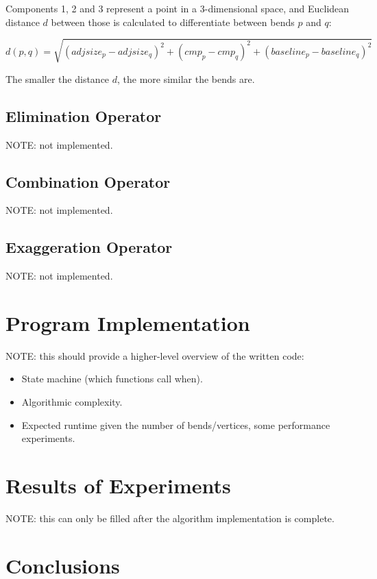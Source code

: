 \documentclass[a4paper]{article}
\begin{document}
Components 1, 2 and 3 represent a point in a 3-dimensional space, and Euclidean
distance $d$ between those is calculated to differentiate between bends $p$ and
$q$:

\[
    d(p,q) = \sqrt{(adjsize_p-adjsize_q)^2 +
                   (cmp_p-cmp_q)^2 +
                   (baseline_p-baseline_q)^2}
\]

The smaller the distance $d$, the more similar the bends are.

\subsection{Elimination Operator}

NOTE: not implemented.

\subsection{Combination Operator}

NOTE: not implemented.

\subsection{Exaggeration Operator}

NOTE: not implemented.

\section{Program Implementation}

NOTE: this should provide a higher-level overview of the written code:

\begin{itemize}
    \item State machine (which functions call when).
    \item Algorithmic complexity.
    \item Expected runtime given the number of bends/vertices, some performance
        experiments.
\end{itemize}

\section{Results of Experiments}

NOTE: this can only be filled after the algorithm implementation is complete.

\section{Conclusions}
\label{sec:conclusions}
\end{document}
